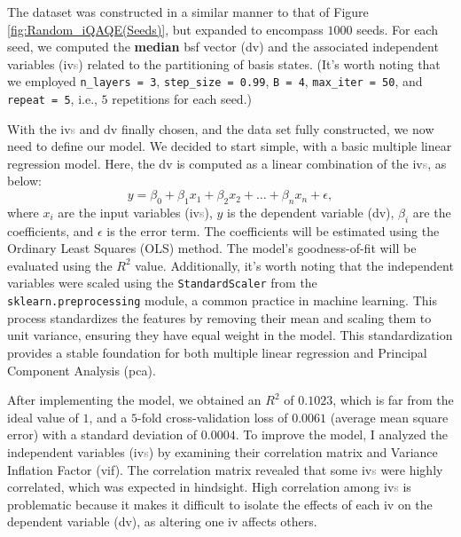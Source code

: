 The dataset was constructed in a similar manner to that of Figure \ref{fig:Random_iQAQE(Seeds)}, but expanded to encompass $1000$ seeds. For each seed, we computed the \textbf{median} \acrshort{bsf} vector (\acrshort{dv}) and the associated independent variables (\acrshort{iv}\textcolor{gray}{s}) related to the partitioning of basis states. (It's worth noting that we employed \texttt{n\_layers = 3}, \texttt{step\_size = 0.99}, \texttt{B = 4}, \texttt{max\_iter = 50}, and \texttt{repeat = 5}, i.e., $5$ repetitions for each seed.)

With the \acrshort{iv}\textcolor{gray}{s} and \acrshort{dv} finally chosen, and the data set fully constructed, we now need to define our model. We decided to start simple, with a basic multiple linear regression model. Here, the \acrshort{dv} is computed as a linear combination of the \acrshort{iv}\textcolor{gray}{s}, as below:
\begin{equation}
    y = \beta_0 + \beta_1 x_1 + \beta_2 x_2 + \ldots + \beta_n x_n + \epsilon,
\end{equation}
where $x_i$ are the input variables (\acrshort{iv}\textcolor{gray}{s}), $y$ is the dependent variable (\acrshort{dv}), $\beta_i$ are the coefficients, and $\epsilon$ is the error term. The coefficients will be estimated using the Ordinary Least Squares (OLS) method. The model's goodness-of-fit will be evaluated using the $R^2$ value. Additionally, it's worth noting that the independent variables were scaled using the \texttt{StandardScaler} from the \texttt{sklearn.preprocessing} module, a common practice in machine learning. This process standardizes the features by removing their mean and scaling them to unit variance, ensuring they have equal weight in the model. This standardization provides a stable foundation for both multiple linear regression and Principal Component Analysis (\acrshort{pca}).

After implementing the model, we obtained an $R^2$ of $0.1023$, which is far from the ideal value of $1$, and a $5$-fold cross-validation loss of $0.0061$ (average mean square error) with a standard deviation of $0.0004$. To improve the model, I analyzed the independent variables (\acrshort{iv}\textcolor{gray}{s}) by examining their correlation matrix and Variance Inflation Factor (\acrshort{vif}). The correlation matrix revealed that some \acrshort{iv}\textcolor{gray}{s} were highly correlated, which was expected in hindsight. High correlation among \acrshort{iv}\textcolor{gray}{s} is problematic because it makes it difficult to isolate the effects of each \acrshort{iv} on the dependent variable (\acrshort{dv}), as altering one \acrshort{iv} affects others.


